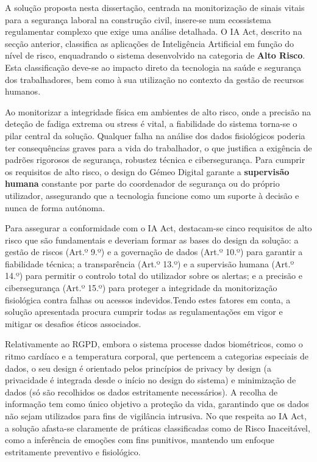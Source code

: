 A solução proposta nesta dissertação, centrada na monitorização de sinais vitais para a segurança laboral na construção civil, insere-se num ecossistema regulamentar complexo que exige uma análise detalhada. O IA Act, descrito na secção anterior, classifica as aplicações de Inteligência Artificial em função do nível de risco, enquadrando o sistema desenvolvido na categoria de \textbf{Alto Risco}. Esta classificação deve-se ao impacto direto da tecnologia na saúde e segurança dos trabalhadores, bem como à sua utilização no contexto da gestão de recursos humanos.

Ao monitorizar a integridade física em ambientes de alto risco, onde a precisão na deteção de fadiga extrema ou stress é vital, a fiabilidade do sistema torna-se o pilar central da solução. Qualquer falha na análise dos dados fisiológicos poderia ter consequências graves para a vida do trabalhador, o que justifica a exigência de padrões rigorosos de segurança, robustez técnica e cibersegurança. Para cumprir os requisitos de alto risco, o design do Gémeo Digital garante a \textbf{supervisão humana} constante por parte do coordenador de segurança ou do próprio utilizador, assegurando que a tecnologia funcione como um suporte à decisão e nunca de forma autónoma.

Para assegurar a conformidade com o IA Act, destacam-se cinco requisitos de alto risco que são fundamentais e deveriam formar as bases do design da solução: a gestão de riscos (Art.º 9.º) e a governação de dados (Art.º 10.º) para garantir a fiabilidade técnica; a transparência (Art.º 13.º) e a supervisão humana (Art.º 14.º) para permitir o controlo total do utilizador sobre os alertas; e a precisão e cibersegurança (Art.º 15.º) para proteger a integridade da monitorização fisiológica contra falhas ou acessos indevidos.Tendo estes fatores em conta, a solução apresentada procura cumprir todas as regulamentações em vigor e mitigar os desafios éticos associados. 

Relativamente ao RGPD, embora o sistema processe dados biométricos, como o ritmo cardíaco e a temperatura corporal, que pertencem a categorias especiais de dados, o seu design é orientado pelos princípios de privacy by design (a privacidade é integrada desde o início no design do sistema) e minimização de dados (só são recolhidos os dados estritamente necessários). A recolha de informação tem como único objetivo a proteção da vida, garantindo que os dados não sejam utilizados para fins de vigilância intrusiva. No que respeita ao IA Act, a solução afasta-se claramente de práticas classificadas como de Risco Inaceitável, como a inferência de emoções com fins punitivos, mantendo um enfoque estritamente preventivo e fisiológico.

